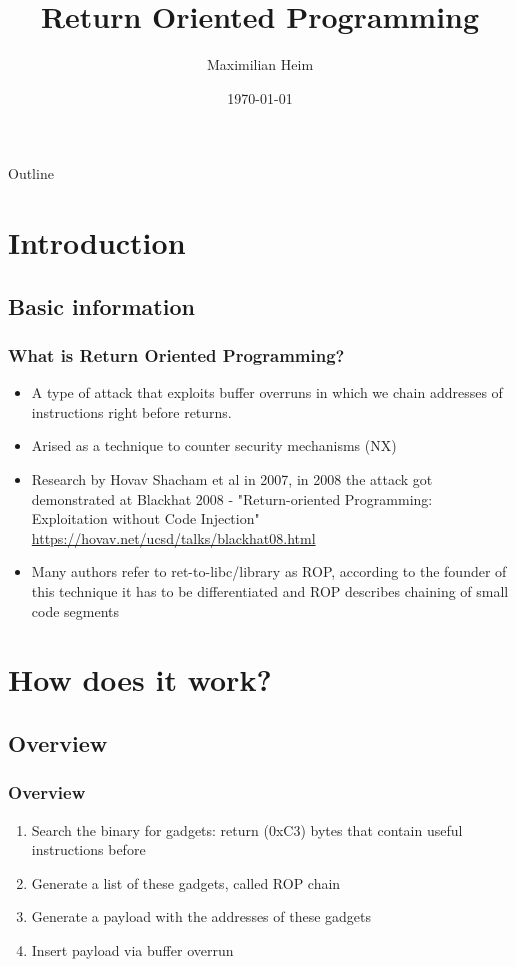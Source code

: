 \documentclass[11pt]{beamer}
\author{Maximilian Heim}
\title{Return Oriented Programming}
\institute{University Albstadt-Sigmaringen}
\date{\today}
\begin{document}
\begin{frame}
\titlepage
\end{frame}

\begin{frame}{Outline}
\tableofcontents
\end{frame}

\section{Introduction}
\subsection{Basic information}
\begin{frame}
    \frametitle{What is Return Oriented Programming?}
    \begin{itemize}
    \item A type of attack that exploits buffer overruns in which we chain addresses of instructions right before returns.
    \item Arised as a technique to counter security mechanisms (NX)
    \item Research by Hovav Shacham et al in 2007, in 2008 the attack got demonstrated at Blackhat 2008 - "Return-oriented Programming: Exploitation without Code Injection" \url{https://hovav.net/ucsd/talks/blackhat08.html}
    \item Many authors refer to ret-to-libc/library as ROP, according to the founder of this technique it has to be differentiated and ROP describes chaining of small code segments
    \end{itemize}
\end{frame}

\section{How does it work?}
\subsection{Overview}
\begin{frame}
    \frametitle{Overview}
    \begin{enumerate}
        \item Search the binary for gadgets: return (0xC3) bytes that contain useful instructions before
        \item Generate a list of these gadgets, called ROP chain
        \item Generate a payload with the addresses of these gadgets
        \item Insert payload via buffer overrun
    \end{enumerate} 
\end{frame}
\end{document}
